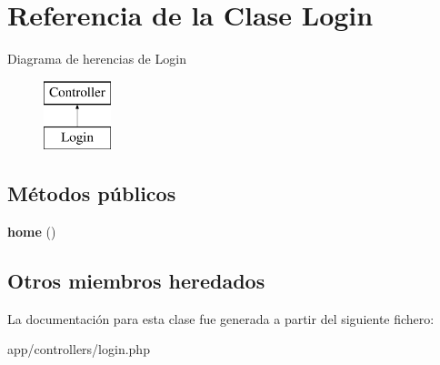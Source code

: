 \hypertarget{class_login}{}\section{Referencia de la Clase Login}
\label{class_login}
Diagrama de herencias de Login\begin{figure}[H]
\begin{center}
\leavevmode
\includegraphics[height=2.000000cm]{class_login}
\end{center}
\end{figure}
\subsection*{Métodos públicos}
\begin{DoxyCompactItemize}
\item 
\hypertarget{class_login_a174b8e4c7d4d7363c6f773671defdeff}{}{\bfseries home} ()\label{class_login_a174b8e4c7d4d7363c6f773671defdeff}

\end{DoxyCompactItemize}
\subsection*{Otros miembros heredados}


La documentación para esta clase fue generada a partir del siguiente fichero\+:\begin{DoxyCompactItemize}
\item 
app/controllers/login.\+php\end{DoxyCompactItemize}
